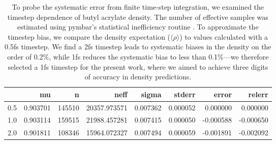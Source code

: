 \documentclass[journal=jacsat,manuscript=article]{achemso}
\begin{document}
\begin{table}
\begin{tabular}{lrrrrrrr}
\toprule
{} &        mu &       n &          neff &     sigma &    stderr &     error &    relerr \\
\midrule
0.5 &  0.903701 &  145510 &  20357.973571 &  0.007362 &  0.000052 &  0.000000 &  0.000000 \\
1.0 &  0.903114 &  159515 &  21988.457281 &  0.007415 &  0.000050 & -0.000588 & -0.000650 \\
2.0 &  0.901811 &  108346 &  15964.072327 &  0.007494 &  0.000059 & -0.001891 & -0.002092 \\
\bottomrule
\end{tabular}
\caption{To probe the systematic error from finite time-step integration, we examined the timestep dependence of butyl acrylate density.  The number of effective samples was estimated using pymbar's statistical inefficiency routine \cite{shirts2008statistically}.  To approximate the timestep bias, we compare the density expectation ($\langle \rho \rangle$) to values calculated with a 0.5fs timestep.  We find a 2fs timestep leads to systematic biases in the density on the order of 0.2\%, while 1fs reduces the systematic bias to less than 0.1\%---we therefore selected a 1fs timestep for the present work, where we aimed to achieve three digits of accuracy in density predictions.
}
\label{table:TimestepDependence}
\end{table}
\end{document}
